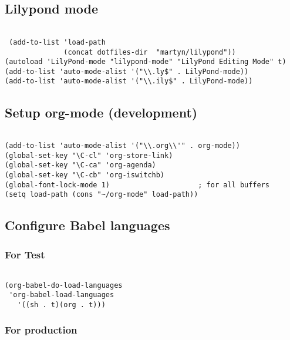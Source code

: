 \documentclass[colorlinks=true,urlcolor=blue,listings-sv]{article}
\begin{document}
\subsection{Lilypond mode}
\label{sec-1-30}

 

\lstset{language=Lisp}
\begin{lstlisting}

 (add-to-list 'load-path
              (concat dotfiles-dir  "martyn/lilypond"))
(autoload 'LilyPond-mode "lilypond-mode" "LilyPond Editing Mode" t)
(add-to-list 'auto-mode-alist '("\\.ly$" . LilyPond-mode))
(add-to-list 'auto-mode-alist '("\\.ily$" . LilyPond-mode))
\end{lstlisting}
 
\subsection{Setup org-mode (development)}
\label{sec-1-31}



\lstset{language=Lisp}
\begin{lstlisting}

(add-to-list 'auto-mode-alist '("\\.org\\'" . org-mode))
(global-set-key "\C-cl" 'org-store-link)
(global-set-key "\C-ca" 'org-agenda)
(global-set-key "\C-cb" 'org-iswitchb)
(global-font-lock-mode 1)                     ; for all buffers
(setq load-path (cons "~/org-mode" load-path))
\end{lstlisting}
\subsection{Configure Babel languages}
\label{sec-1-32}
\subsubsection{For Test}
\label{sec-1-32-1}


\lstset{language=Lisp}
\begin{lstlisting}

(org-babel-do-load-languages
 'org-babel-load-languages
   '((sh . t)(org . t)))
\end{lstlisting}
\subsubsection{For production}
\label{sec-1-32-2}
\label{9983a066-2f94-4446-82e5-bea078211562}
\end{document}
